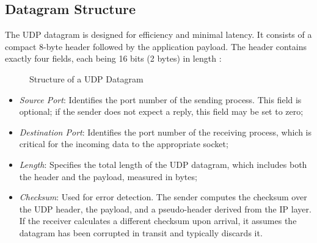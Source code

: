 \subsection{Datagram Structure}
The UDP datagram is designed for efficiency and minimal latency. 
It consists of a compact 8-byte header followed by the application payload. 
The header contains exactly four fields, each being 16 bits (2 bytes) in length \cite{rfc768}:

\begin{figure}[htbp]
    \centering
    \caption{Structure of a UDP Datagram}
    \label{fig:udp_datagram}
\end{figure}

\begin{itemize}
    \item \emph{Source Port}: Identifies the port number of the sending process. This field is optional; if the sender does not expect a reply, this field may be set to zero;
    \item \emph{Destination Port}: Identifies the port number of the receiving process, which is critical for  the incoming data to the appropriate socket;
    \item \emph{Length}: Specifies the total length of the UDP datagram, which includes both the header and the payload, measured in bytes;
    \item \emph{Checksum}: Used for error detection. The sender computes the checksum over the UDP header, the payload, and a pseudo-header derived from the IP layer. If the receiver calculates a different checksum upon arrival, it assumes the datagram has been corrupted in transit and typically discards it.
\end{itemize}

